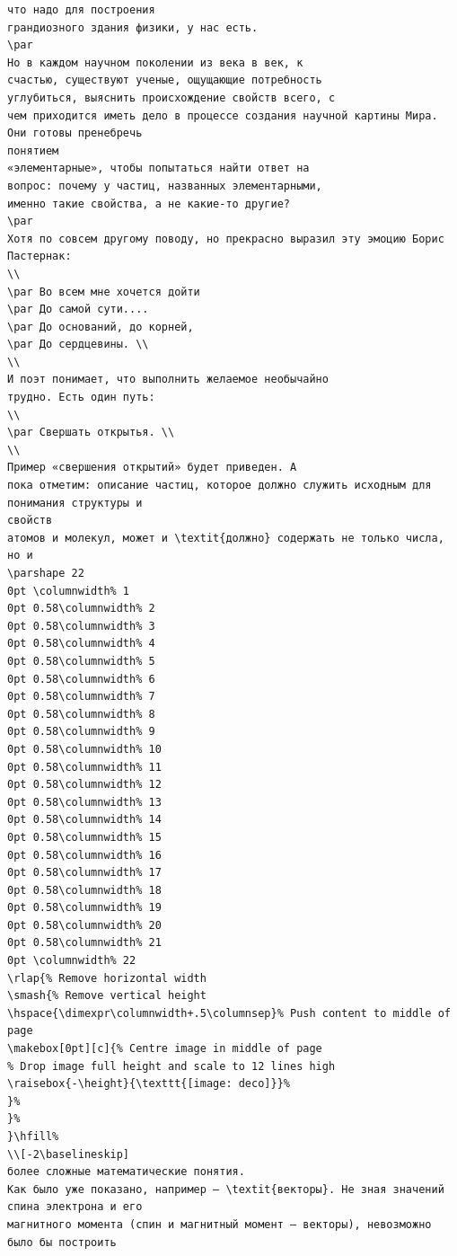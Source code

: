 \documentclass[a4paper,10pt]{article}
\begin{document}
\begin{verbatim}
что надо для построения
грандиозного здания физики, у нас есть.
\par
Но в каждом научном поколении из века в век, к
счастью, существуют ученые, ощущающие потребность
углубиться, выяснить происхождение свойств всего, с
чем приходится иметь дело в процессе создания научной картины Мира. Они готовы пренебречь
понятием
«элементарные», чтобы попытаться найти ответ на
вопрос: почему у частиц, названных элементарными,
именно такие свойства, а не какие-то другие?
\par
Хотя по совсем другому поводу, но прекрасно выразил эту эмоцию Борис Пастернак:
\\
\par Во всем мне хочется дойти
\par До самой сути....
\par До оснований, до корней,
\par До сердцевины. \\
\\
И поэт понимает, что выполнить желаемое необычайно
трудно. Есть один путь:
\\
\par Свершать открытья. \\
\\
Пример «свершения открытий» будет приведен. А
пока отметим: описание частиц, которое должно служить исходным для понимания структуры и
свойств
атомов и молекул, может и \textit{должно} содержать не только числа, но и
\parshape 22
0pt \columnwidth% 1
0pt 0.58\columnwidth% 2
0pt 0.58\columnwidth% 3
0pt 0.58\columnwidth% 4
0pt 0.58\columnwidth% 5
0pt 0.58\columnwidth% 6
0pt 0.58\columnwidth% 7
0pt 0.58\columnwidth% 8
0pt 0.58\columnwidth% 9
0pt 0.58\columnwidth% 10
0pt 0.58\columnwidth% 11
0pt 0.58\columnwidth% 12
0pt 0.58\columnwidth% 13
0pt 0.58\columnwidth% 14
0pt 0.58\columnwidth% 15
0pt 0.58\columnwidth% 16
0pt 0.58\columnwidth% 17
0pt 0.58\columnwidth% 18
0pt 0.58\columnwidth% 19
0pt 0.58\columnwidth% 20
0pt 0.58\columnwidth% 21
0pt \columnwidth% 22
\rlap{% Remove horizontal width
\smash{% Remove vertical height
\hspace{\dimexpr\columnwidth+.5\columnsep}% Push content to middle of page
\makebox[0pt][c]{% Centre image in middle of page
% Drop image full height and scale to 12 lines high
\raisebox{-\height}{\texttt{[image: deco]}}%
}%
}%
}\hfill%
\\[-2\baselineskip]
более сложные математические понятия.
Как было уже показано, например – \textit{векторы}. Не зная значений спина электрона и его
магнитного момента (спин и магнитный момент – векторы), невозможно было бы построить

\end{verbatim}
\end{document}
